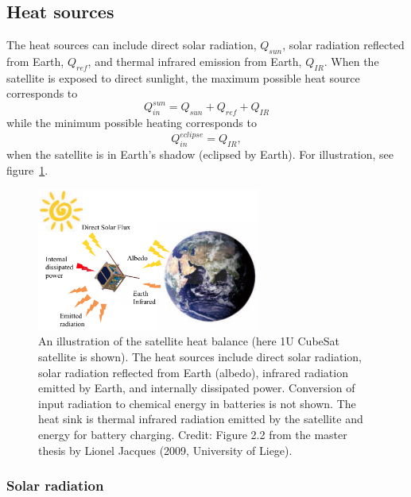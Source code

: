\documentclass[]{aastex62}
\def\eq#1{\begin{equation} #1 \end{equation}}
\begin{document}
\subsection{Heat sources} 

The heat sources can include direct solar radiation, $Q_{sun}$, solar radiation reflected from Earth, 
$Q_{ref}$, and thermal infrared emission from Earth, $Q_{IR}$. When the satellite is exposed to direct 
sunlight, the maximum possible heat source corresponds to 
\eq{
\label{eq:QinSun} 
                   Q_{in}^{sun}  = Q_{sun} + Q_{ref} + Q_{IR}  
} 
while the minimum possible heating corresponds to 
\eq{
\label{eq:QinEclipse} 
                     Q_{in}^{eclipse}  = Q_{IR},
} 
when the satellite is in Earth's shadow (eclipsed by Earth). For illustration, see figure~\ref{fig:JacquesFig22}. 

 

\begin{figure}[t]
\centering
\includegraphics[width=0.65\textwidth, keepaspectratio]{figures/Jacques_heatSources.png} 
\caption{An illustration of the satellite heat balance (here 1U CubeSat satellite is shown). 
The heat sources include direct solar radiation, solar radiation reflected from Earth (albedo), 
infrared radiation emitted by Earth, and internally dissipated power. Conversion of input
radiation to chemical energy in batteries is not shown. The heat sink is thermal infrared radiation 
emitted by the satellite and energy for battery charging. Credit: Figure 2.2 from the master thesis 
by Lionel Jacques (2009, University of Liege). 
\label{fig:JacquesFig22}}
\end{figure}


\subsubsection{Solar radiation} 
\end{document}
